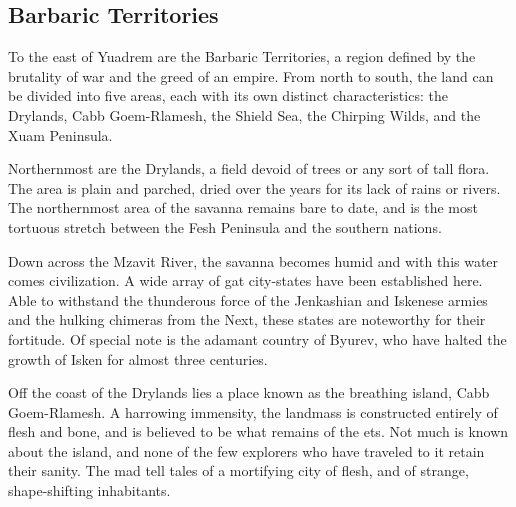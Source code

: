 

\subsection*{Barbaric Territories} \label{ssec::barbaricterritories}

To the east of Yuadrem are the Barbaric Territories, a region defined by the brutality of war and the greed of an empire.
From north to south, the land can be divided into five areas, each with its own distinct characteristics: the Drylands, Cabb Goem-Rlamesh, the Shield Sea, the Chirping Wilds, and the Xuam Peninsula.

Northernmost are the Drylands, a field devoid of trees or any sort of tall flora.
The area is plain and parched, dried over the years for its lack of rains or rivers.
The northernmost area of the savanna remains bare to date, and is the most tortuous stretch between the Fesh Peninsula and the southern nations.

Down across the Mzavit River, the savanna becomes humid and with this water comes civilization.
A wide array of gat city-states have been established here.
Able to withstand the thunderous force of the Jenkashian and Iskenese armies and the hulking chimeras from the Next, these states are noteworthy for their fortitude.
Of special note is the adamant country of Byurev, who have halted the growth of Isken for almost three centuries.

Off the coast of the Drylands lies a place known as the breathing island, Cabb Goem-Rlamesh.
A harrowing immensity, the landmass is constructed entirely of flesh and bone, and is believed to be what remains of the ets.
Not much is known about the island, and none of the few explorers who have traveled to it retain their sanity.
The mad tell tales of a mortifying city of flesh, and of strange, shape-shifting inhabitants.

